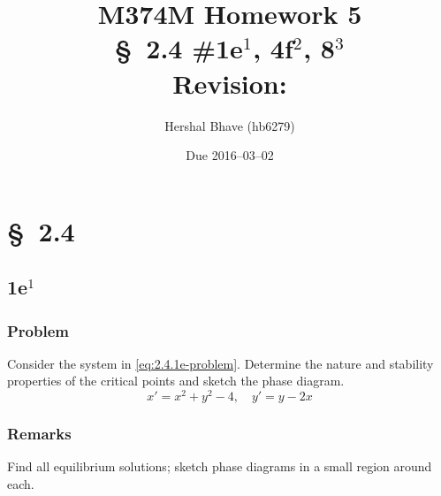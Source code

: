 \documentclass[12pt,twoside]{article}
\title{M374M Homework 5 \\
  \normalsize{\S~2.4 \#1e$^1$, 4f$^2$, 8$^3$} \\
  Revision: }
\author{Hershal Bhave (hb6279)}
\date{Due 2016--03--02}
\begin{document}
\maketitle
\section{\S~2.4}
\subsection{1e$^1$}
\subsubsection*{Problem}
Consider the system in \cref{eq:2.4.1e-problem}. Determine the nature and
stability properties of the critical points and sketch the phase diagram.
\begin{equation}
  \label{eq:2.4.1e-problem}
  x'=x^2+y^2-4,\quad y'=y-2x
\end{equation}

\subsubsection*{Remarks}
Find all equilibrium solutions; sketch phase diagrams in a small region around
each.
\end{document}
